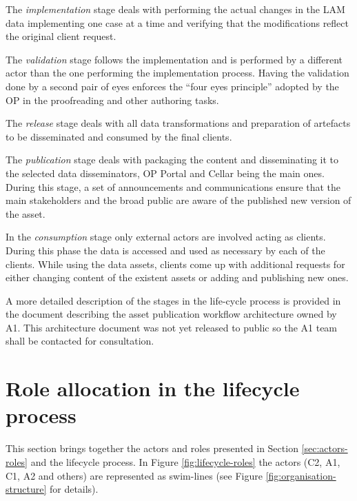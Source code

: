 	The \textit{implementation} stage deals with performing the actual changes in the LAM data implementing one case at a time and verifying that the modifications reflect the original client request.
	
	The \textit{validation} stage follows the implementation and is performed by a different actor than the one performing the implementation process. Having the validation done by a second pair of eyes enforces the ``four eyes principle'' adopted by the OP in the proofreading and other authoring tasks. 
	
	The \textit{release} stage deals with all data
transformations and preparation of artefacts to be disseminated and consumed by the final clients. 
		
	The \textit{publication} stage deals with packaging the content and disseminating it to the
selected data disseminators, OP Portal and Cellar being the main ones. During this stage, a
set of announcements and communications ensure that the main stakeholders and
the broad public are aware of the published new version of the asset.
	
	In the \textit{consumption} stage only external actors are involved acting as clients. During this phase the data is accessed and used as necessary by each of the clients. While using the data assets, clients come up with additional requests for either changing content
of the existent assets or adding and publishing new ones.
	
	A more detailed description of the stages in the life-cycle process is provided in the document describing the asset publication workflow architecture \citep{costetchi2020d} owned by A1. This architecture document was not yet released to public so the A1 team shall be contacted for consultation.
	
	\section{Role allocation in the lifecycle process}
	
	This section brings together the actors and roles presented in Section \ref{sec:actors-roles} and the lifecycle process. In Figure \ref{fig:lifecycle-roles} the actors (C2, A1, C1, A2 and others) are represented as swim-lines (see Figure \ref{fig:organisation-structure} for details). 
	

